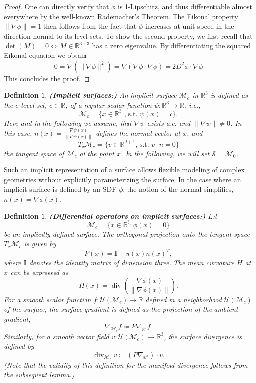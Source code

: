 \documentclass[12pt,openany]{book}
\newcommand{\R}{\mathbb{R}}
\def\S{\mathcal{S}}
\theoremstyle{plainnormal}
\newtheorem{definition}[theorem]{Definition}
\theoremstyle{remark}
\begin{document}
\begin{proof}
    One can directly verify that \( \phi \) is 1-Lipschitz, and thus differentiable almost everywhere by the well-known Rademacher's Theorem. The Eikonal property \( \|\nabla \phi\| = 1 \) then follows from the fact that \( \phi \) increases at unit speed in the direction normal to its level sets. To show the second property, we first recall that {$\det(M) = 0 \Leftrightarrow M\in\R^{3\times3}$} has a zero eigenvalue. By differentiating the squared Eikonal equation we obtain
    \begin{equation*}
        0 = \nabla(\|\nabla \phi\|^2)
        = \nabla ( \nabla \phi \cdot \nabla\phi)
        = 2 D^2 \phi \cdot \nabla\phi
    \end{equation*} 
    This concludes the proof.
\end{proof}
\begin{definition}\textbf{(Implicit surfaces:)}
    An \emph{implicit surface} $\mathcal{M}_c$ in $\R^3$ is defined as the $c$-level set, $c\in \R$, of a regular scalar function $\psi: \R^3\rightarrow\R$, i.e.,
$$\mathcal M_c=\{x\in\R^3 \text{ , s.t. } \psi(x)=c\}.$$
Here and in the following we assume, that $\nabla\psi$ exists a.e. and $\|\nabla \psi\|\neq 0$.
    In this case, $n(x) = \frac{\nabla \psi(x)}{\|\nabla \psi(x)\|}$ defines the normal vector at $x$, and $$T_x\mathcal{M}_c = \{v\in \R^{d+1} \text{, s.t. } v\cdot n = 0\}$$ the tangent space of $\mathcal{M}_c$ at the point $x$. In the following, we will set $\S = \mathcal{M}_0$.
\end{definition}
Such an implicit representation of a surface allows flexible modeling of complex geometries without explicitly parameterizing the surface. In the case where an implicit surface is defined by an SDF $\phi$, the notion of the normal simplifies, \mbox{$n(x) = {\nabla \phi(x)}$}.  
\begin{definition}\label{def:diff_ops_implicit_surface}\textbf{(Differential operators on implicit surfaces:)} Let $$\mathcal{M}_c = \{ x \in \mathbb{R}^{3} : \phi(x) = 0 \}$$ be an implicitly defined surface. 
The \emph{orthogonal projection} onto the tangent space \(T_x \mathcal{M}_c\) is given by
\[
P(x) = \mathbf I - n(x) n(x)^T,
\]
where \(\mathbf I\) denotes the identity matrix of dimension three.
The \emph{mean curvature} \(H\) at \(x\) can be expressed as
\[
H(x) =  \operatorname{div} \left( \frac{\nabla \phi(x)}{\|\nabla \phi(x)\|} \right).
\]
For a smooth scalar function \(f : \mathcal{U}(\mathcal{M}_c) \to \mathbb{R}\) defined in a neighborhood \(\mathcal{U}(\mathcal{M}_c)\) of the surface, the \emph{surface gradient} is defined as the projection of the ambient gradient,
\[
\nabla_{\mathcal{M}_c} f \coloneqq P \nabla_{\mathbb{R}^{3}} f.
\]
Similarly, for a smooth vector field \(v : \mathcal{U}(\mathcal{M}_c) \to \mathbb{R}^{3}\), the \emph{surface divergence} is defined by
\[
\operatorname{div}_{\mathcal{M}_c} v \coloneqq  (P \nabla_{\mathbb{R}^{3}}) \cdot v.
\]
(Note that the validity of this definition for the manifold divergence follows from the subsequent lemma.)
\end{definition}
\end{document}
